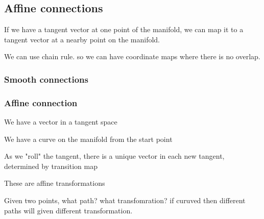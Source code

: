
\subsection{Affine connections}

If we have a tangent vector at one point of the manifold, we can map it to a tangent vector at a nearby point on the manifold.

We can use chain rule. so we can have coordinate maps where there is no overlap.

\subsubsection{Smooth connections}

\subsubsection{Affine connection}

We have a vector in a tangent space

We have a curve on the manifold from the start point

As we "roll" the tangent, there is a unique vector in each new tangent, determined by transition map

These are affine transformations

Given two points, what path? what transfomration? if curuved then different paths will given different transformation.


